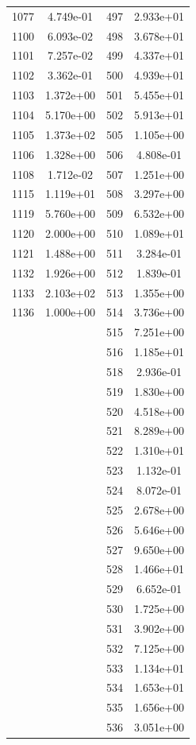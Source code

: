 \documentclass[12pt]{article}
\begin{document}
\begin{longtable}{@{}cccc@{}}
1077 & 4.749e-01 & 497 & 2.933e+01 \\
1100 & 6.093e-02 & 498 & 3.678e+01 \\
1101 & 7.257e-02 & 499 & 4.337e+01 \\
1102 & 3.362e-01 & 500 & 4.939e+01 \\
1103 & 1.372e+00 & 501 & 5.455e+01 \\
1104 & 5.170e+00 & 502 & 5.913e+01 \\
1105 & 1.373e+02 & 505 & 1.105e+00 \\
1106 & 1.328e+00 & 506 & 4.808e-01 \\
1108 & 1.712e-02 & 507 & 1.251e+00 \\
1115 & 1.119e+01 & 508 & 3.297e+00 \\
1119 & 5.760e+00 & 509 & 6.532e+00 \\
1120 & 2.000e+00 & 510 & 1.089e+01 \\
1121 & 1.488e+00 & 511 & 3.284e-01 \\
1132 & 1.926e+00 & 512 & 1.839e-01 \\
1133 & 2.103e+02 & 513 & 1.355e+00 \\
1136 & 1.000e+00 & 514 & 3.736e+00 \\
 &  & 515 & 7.251e+00 \\
 &  & 516 & 1.185e+01 \\
 &  & 518 & 2.936e-01 \\
 &  & 519 & 1.830e+00 \\
 &  & 520 & 4.518e+00 \\
 &  & 521 & 8.289e+00 \\
 &  & 522 & 1.310e+01 \\
 &  & 523 & 1.132e-01 \\
 &  & 524 & 8.072e-01 \\
 &  & 525 & 2.678e+00 \\
 &  & 526 & 5.646e+00 \\
 &  & 527 & 9.650e+00 \\
 &  & 528 & 1.466e+01 \\
 &  & 529 & 6.652e-01 \\
 &  & 530 & 1.725e+00 \\
 &  & 531 & 3.902e+00 \\
 &  & 532 & 7.125e+00 \\
 &  & 533 & 1.134e+01 \\
 &  & 534 & 1.653e+01 \\
 &  & 535 & 1.656e+00 \\
 &  & 536 & 3.051e+00 \\

\end{longtable}
\end{document}
